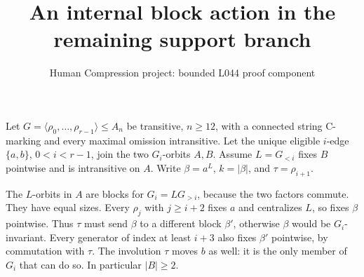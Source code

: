 \documentclass[11pt,a4paper]{article}
\title{An internal block action in the remaining support branch}
\author{Human Compression project: bounded L044 proof component}
\date{}
\newcommand{\gen}[1]{\langle#1\rangle}
\begin{document}
\maketitle
Let $G=\gen{\rho_0,\ldots,\rho_{r-1}}\leq A_n$ be transitive,
$n\geq12$, with a connected string C-marking and every maximal
omission intransitive. Let the unique eligible $i$-edge
$\{a,b\}$, $0<i<r-1$, join the two $G_i$-orbits $A,B$.
Assume $L=G_{<i}$ fixes $B$ pointwise and is intransitive on $A$.
Write $\beta=a^L$, $k=|\beta|$, and $\tau=\rho_{i+1}$.

The $L$-orbits in $A$ are blocks for $G_i=L G_{>i}$, because
the two factors commute. They have equal sizes. Every
$\rho_j$ with $j\geq i+2$ fixes $a$ and centralizes $L$, so
fixes $\beta$ pointwise. Thus $\tau$ must send $\beta$ to
a different block $\beta'$, otherwise $\beta$ would be
$G_i$-invariant. Every generator of index at least $i+3$
also fixes $\beta'$ pointwise, by commutation with $\tau$.
The involution $\tau$ moves $b$ as well: it is the only
member of $G_i$ that can do so. In particular $|B|\geq2$.
\end{document}
